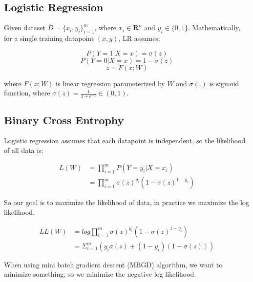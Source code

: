 \documentclass[journal, a4paper]{IEEEtran}
\begin{document}
\subsection{Logistic Regression}
Given dataset $ D=\{x_{i}, y_{i}\}_{i=1}^{m}$, where $x_{i} \in \mathbf{R}^{n}$ and $y_{i} \in \{0, 1\}$. Mathematically, for a single training datapoint $(x, y)$, LR assumes: \par
 \begin{center}
	\begin{equation}
	P(Y = 1|X = x) = \sigma(z) 
	\end{equation}
	\begin{equation}
	P(Y = 0|X = x) = 1 - \sigma(z)
	\end{equation}
	\begin{equation}
	z = F(x; W)
	\end{equation}
\end{center} \par
where $F(x; W)$ is linear regression parameterized by $W$ and $\sigma(.)$ is sigmoid function, where $\sigma(z) = \frac{1}{1 + e^{-z}} \in (0, 1)$.
\subsection{Binary Cross Entrophy}
Logistic regression assumes that each datapoint is independent, so the likelihood of all data is: \par
\begin{equation}
	\begin{aligned}
	L(W) &= \prod_{i=1}^m P(Y = y_i | X = x_i) \\ &= \prod_{i=1}^m \sigma(z)^{y_i} (1 - \sigma(z)^{1 - y_i} )
	\end{aligned}
\end{equation} \par

So our goal is to maximize the likelihood of data, in practice we maximize the log likelihood. \par
\begin{equation}
\begin{aligned}
LL(W) &= log\prod_{i=1}^m \sigma(z)^{y_i} (1 - \sigma(z)^{1 - y_i} ) \\ &= \Sigma_{i=1}^{m} (y_i \sigma(z) + (1 - y_i)(1 - \sigma(z)))
\end{aligned}
\end{equation} \par
When using mini batch gradient descent (MBGD) algorithm, we want to minimize something, so we minimize the negative log likelihood. \par
\end{document}
